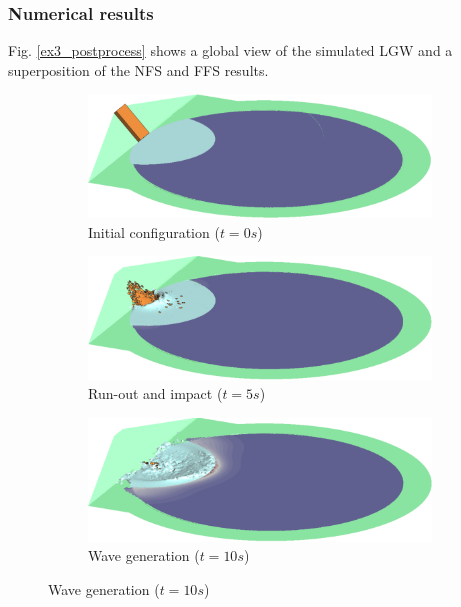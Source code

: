 \subsubsection{Numerical results}

Fig. \ref{ex3_postprocess} shows a global view of the simulated LGW and a superposition of the NFS and FFS results.


\begin{figure} [p]
    \centering
    \begin{subfigure}{\textwidth}
        \centering
        \caption{Initial configuration ($t=0s$)}
        \includegraphics[width=.85\textwidth]{img/coupling/ex3_t0.png}
    \end{subfigure}
    \vspace{5pt}

    \begin{subfigure}{\textwidth}
        \centering
        \caption{Run-out and impact ($t=5s$)}
        \includegraphics[width=.85\textwidth]{img/coupling/ex3_t5.png}
    \end{subfigure}
    \vspace{5pt}

    \begin{subfigure}{\textwidth}
        \centering
        \caption{Wave generation ($t=10s$)}
        \includegraphics[width=.85\textwidth]{img/coupling/ex3_t10.png}
    \end{subfigure}
    \vspace{5pt}


\end{figure}

